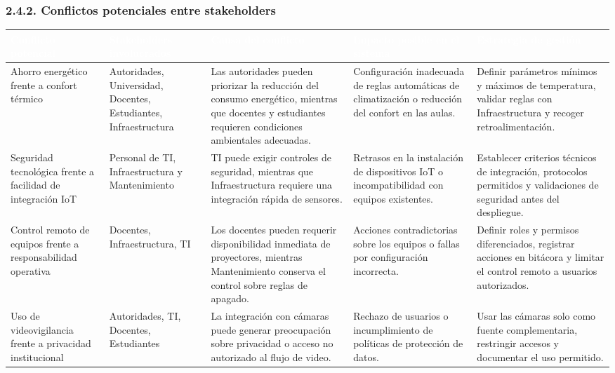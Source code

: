 \subsubsection*{2.4.2. Conflictos potenciales entre stakeholders}


\begingroup
\small
\begin{longtable}{|P{0.2000}|P{0.2000}|P{0.2000}|P{0.2000}|P{0.2000}|}
\hline
{}\textcolor{white}{\textbf{Conflicto potencial}} & \textcolor{white}{\textbf{Stakeholders involucrados}} & \textcolor{white}{\textbf{Causa del conflicto}} & \textcolor{white}{\textbf{Impacto posible en el sistema}} & \textcolor{white}{\textbf{Estrategia de gestión}} \\ \hline
Ahorro energético frente a confort térmico & Autoridades, Universidad, Docentes, Estudiantes, Infraestructura & Las autoridades pueden priorizar la reducción del consumo energético, mientras que docentes y estudiantes requieren condiciones ambientales adecuadas. & Configuración inadecuada de reglas automáticas de climatización o reducción del confort en las aulas. & Definir parámetros mínimos y máximos de temperatura, validar reglas con Infraestructura y recoger retroalimentación. \\ \hline
Seguridad tecnológica frente a facilidad de integración IoT & Personal de TI, Infraestructura y Mantenimiento & TI puede exigir controles de seguridad, mientras que Infraestructura requiere una integración rápida de sensores. & Retrasos en la instalación de dispositivos IoT o incompatibilidad con equipos existentes. & Establecer criterios técnicos de integración, protocolos permitidos y validaciones de seguridad antes del despliegue. \\ \hline
Control remoto de equipos frente a responsabilidad operativa & Docentes, Infraestructura, TI & Los docentes pueden requerir disponibilidad inmediata de proyectores, mientras Mantenimiento conserva el control sobre reglas de apagado. & Acciones contradictorias sobre los equipos o fallas por configuración incorrecta. & Definir roles y permisos diferenciados, registrar acciones en bitácora y limitar el control remoto a usuarios autorizados. \\ \hline
Uso de videovigilancia frente a privacidad institucional & Autoridades, TI, Docentes, Estudiantes & La integración con cámaras puede generar preocupación sobre privacidad o acceso no autorizado al flujo de video. & Rechazo de usuarios o incumplimiento de políticas de protección de datos. & Usar las cámaras solo como fuente complementaria, restringir accesos y documentar el uso permitido. \\ \hline

\end{longtable}

